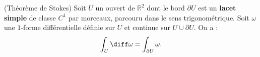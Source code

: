 
\begin{fthm}{(Théorème de Stokes)}
Soit $U$ un ouvert de $\mathbb{R}^2$ dont le bord $\partial U$ est un \textbf{lacet simple}
de classe $C^1$ par morceaux, parcouru dans le sens trigonométrique. Soit $\omega$ une $1$-forme différentielle
définie sur $U$ et continue sur $U \cup  \partial U$. On a : 
\[
\int_{U} \diff \omega = \int_{\partial U} \omega.
\]
\end{fthm}


